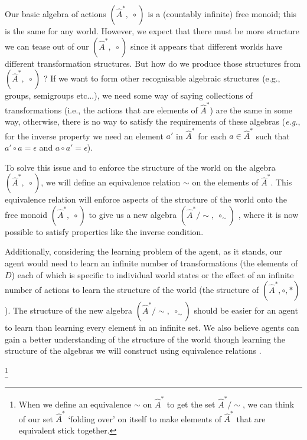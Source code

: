 Our basic algebra of actions $(\hat{A}^{\ast}, \; \circ)$ is a (countably infinite) free monoid; this is the same for any world.
However, we expect that there must be more structure we can tease out of our $(\hat{A}^{\ast}, \; \circ)$ since it appears that different worlds have different transformation structures.
But how do we produce those structures from $(\hat{A}^{\ast}, \; \circ)$ ?
If we want to form other recognisable algebraic structures (e.g., groups, semigroups etc...), we need some way of saying collections of transformations (i.e., the actions that are elements of $\hat{A}^{\ast}$) are the same in some way, otherwise, there is no way to satisfy the requirements of these algebras (\textit{e.g.}, for the inverse property we need an element $a'$ in $\hat{A}^{\ast}$ for each $a \in \hat{A}^{\ast}$ such that $a' \circ a = \epsilon$ and $a \circ a' = \epsilon$).

To solve this issue and to enforce the structure of the world on the algebra $(\hat{A}^{\ast}, \; \circ)$, we will define an equivalence relation $\sim$ on the elements of $\hat{A}^{\ast}$.
This equivalence relation will enforce aspects of the structure of the world onto the free monoid $(\hat{A}^{\ast}, \; \circ)$ to give us a new algebra $(\hat{A}^{\ast}/\sim, \; \circ_{\sim})$ , where it is now possible to satisfy properties like the inverse condition.

Additionally, considering the learning problem of the agent, as it stands, our agent would need to learn an infinite number of transformations (the elements of $D$) each of which is specific to individual world states or the effect of an infinite number of actions to learn the structure of the world (the structure of $(\hat{A}^{\ast}, \circ, \ast)$).
The structure of the new algebra $(\hat{A}^{\ast}/\sim, \; \circ_{\sim})$ should be easier for an agent to learn than learning every element in an infinite set.
We also believe agents can gain a better understanding of the structure of the world though learning the structure of the algebras we will construct using equivalence relations .

\footnote{
When we define an equivalence $\sim$ on $\hat{A}^{\ast}$ to get the set $\hat{A}^{\ast}/\sim$, we can think of our set $\hat{A}^{\ast}$ `folding over' on itself to make elements of $\hat{A}^{\ast}$ that are equivalent stick together.
}




